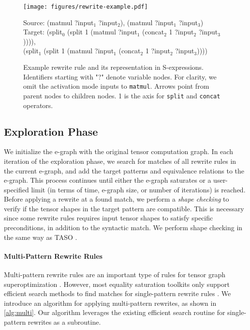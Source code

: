 \begin{figure}[t]
    \centering
    \texttt{[image: figures/rewrite-example.pdf]}
    \begin{scriptsize}
    Source: (matmul ?input$_1$ ?input$_2$), (matmul ?input$_1$ ?input$_3$) \\
    Target: (split$_0$ (split 1 (matmul ?input$_1$ (concat$_2$ 1 ?input$_2$ ?input$_3$)))), \\
    (split$_1$ (split 1 (matmul ?input$_1$ (concat$_2$ 1 ?input$_2$ ?input$_3$))))
    \end{scriptsize}
    \caption{
    Example rewrite rule and its representation in S-expressions.
    Identifiers starting with "?" denote variable nodes.
    For clarity, we omit the activation mode inputs to \texttt{matmul}.
    Arrows point from parent nodes to children nodes.
    1 is the axis for \texttt{split} and \texttt{concat} operators.
    }
    \label{fig:rewrite}
\end{figure}

\subsection{Exploration Phase}
\label{sec:saturation}

We initialize the e-graph with the original tensor computation graph.
In each iteration of the exploration phase, we search for matches of all rewrite rules in the current e-graph, and add the target patterns and equivalence relations to the e-graph.
This process continues until either the e-graph saturates or a user-specified limit (in terms of time, e-graph size, or number of iterations) is reached.
Before applying a rewrite at a found match, we perform a \textit{shape checking} to verify if the tensor shapes in the target pattern are compatible.
This is necessary since some rewrite rules requires input tensor shapes to satisfy specific preconditions, in addition to the syntactic match.
We perform shape checking in the same way as TASO \cite{taso}.


\paragraph{Multi-Pattern Rewrite Rules}

Multi-pattern rewrite rules are an important type of rules for tensor graph superoptimization \cite{taso}.
However, most equality saturation toolkits only support efficient search methods to find matches for single-pattern rewrite rules \cite{egg, ematching}.
We introduce an algorithm for applying multi-pattern rewrites, as shown in \autoref{alg:multi}. Our algorithm leverages the existing efficient search routine for single-pattern rewrites as a subroutine.

